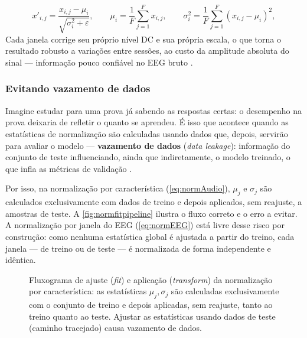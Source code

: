 				\begin{equation}
					\label{eq:normEEG}
					x'_{i,j} = \frac{x_{i,j}-\mu_i}{\sqrt{\sigma_i^2+\varepsilon}}, \qquad
					\mu_i = \frac{1}{F}\sum_{j=1}^{F} x_{i,j}, \qquad
					\sigma_i^2 = \frac{1}{F}\sum_{j=1}^{F}(x_{i,j}-\mu_i)^2,
				\end{equation}
				Cada janela corrige seu próprio nível DC e sua própria escala, o que torna o resultado robusto a variações entre sessões, ao custo da amplitude absoluta do sinal --- informação pouco confiável no EEG bruto \cite{lotte2018review}.

			\subsubsection{Evitando vazamento de dados}
				\label{sec:vazamentoNorm}

				\par Imagine estudar para uma prova já sabendo as respostas certas: o desempenho na prova deixaria de refletir o quanto se aprendeu. É isso que acontece quando as estatísticas de normalização são calculadas usando dados que, depois, servirão para avaliar o modelo --- \textbf{vazamento de dados} (\textit{data leakage}): informação do conjunto de teste influenciando, ainda que indiretamente, o modelo treinado, o que infla as métricas de validação \cite{kaufman2012leakage}.

				\par Por isso, na normalização por característica (\autoref{eq:normAudio}), $\mu_j$ e $\sigma_j$ são calculados exclusivamente com dados de treino e depois aplicados, sem reajuste, a amostras de teste. A \autoref{fig:normfitpipeline} ilustra o fluxo correto e o erro a evitar. A normalização por janela do EEG (\autoref{eq:normEEG}) está livre desse risco por construção: como nenhuma estatística global é ajustada a partir do treino, cada janela --- de treino ou de teste --- é normalizada de forma independente e idêntica.

				\begin{figure}[H]
					\centering
					\caption[Fluxograma de ajuste/aplicação da normalização]{Fluxograma de ajuste (\textit{fit}) e aplicação (\textit{transform}) da normalização por característica: as estatísticas $\mu_j,\sigma_j$ são calculadas exclusivamente com o conjunto de treino e depois aplicadas, sem reajuste, tanto ao treino quanto ao teste. Ajustar as estatísticas usando dados de teste (caminho tracejado) causa vazamento de dados.}
					\resizebox{0.75\linewidth}{!}{}
					\label{fig:normfitpipeline}
				\end{figure}

